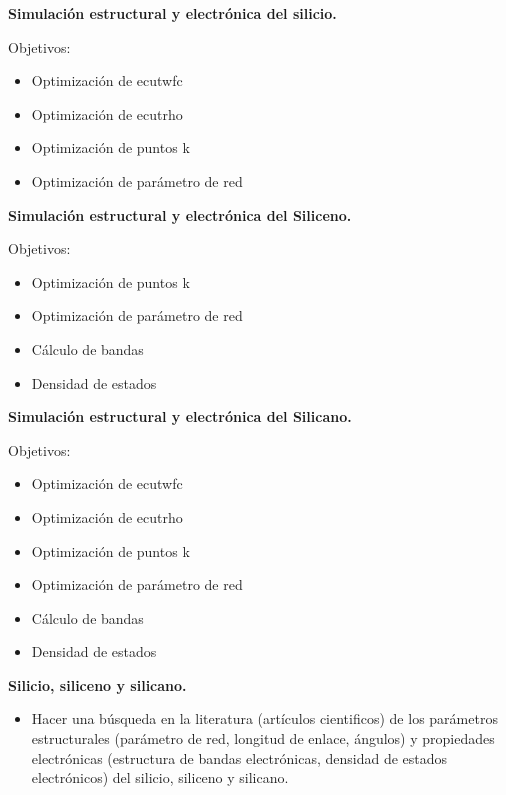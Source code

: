 \textbf{Simulación estructural y electrónica del silicio.}

\vspace{0.4cm}

Objetivos:

\begin{itemize}
    \small
    \item Optimización de ecutwfc
    \item Optimización de ecutrho
    \item Optimización de puntos k
    \item Optimización de parámetro de red
\end{itemize}

\vspace{0.4cm}

\textbf{Simulación estructural y electrónica del Siliceno.}

\vspace{0.4cm}

Objetivos:

\begin{itemize}
    \small
    \item Optimización de puntos k
    \item Optimización de parámetro de red
    \item Cálculo de bandas
    \item Densidad de estados
\end{itemize}

\textbf{Simulación estructural y electrónica del Silicano.}

\vspace{0.4cm}

Objetivos:

\begin{itemize}
    \small
    \item Optimización de ecutwfc
    \item Optimización de ecutrho
    \item Optimización de puntos k
    \item Optimización de parámetro de red
    \item Cálculo de bandas
    \item Densidad de estados
\end{itemize}

\vspace{0.4cm}

\textbf{ Silicio, siliceno y silicano.}

\begin{itemize}
    \item Hacer una búsqueda en la literatura (artículos cientificos) de los parámetros 
          estructurales (parámetro de red, longitud de enlace, ángulos) y propiedades
          electrónicas (estructura de bandas electrónicas, densidad de estados electrónicos)
          del silicio, siliceno y silicano.
\end{itemize}